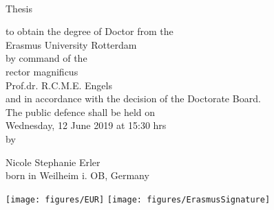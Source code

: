 \setlength{\unitlength}{1mm}
\begin{center}
     \vspace*{0.2cm}
   {
   \fontsize{16}{22}\selectfont{
   \thetitle}  \\[1.05ex]
   }


      \vspace{1cm}

     {\fontsize{14}{18}\selectfont{
     \dutchtitle \\[1.05ex]
     }}
     \vspace{0.5cm}
      {\fontsize{14}{22}\selectfont\par\vspace{0.5cm}
       {Thesis}}
     \vspace{0.5cm}
      {\fontsize{10}{10}\selectfont\par\vspace*{0.5cm}
       {to obtain the degree of Doctor from the\\
       Erasmus University Rotterdam\\
       by command of the\\
       rector magnificus\\ \vspace{0.5cm}
       Prof.dr. R.C.M.E. Engels\\ \vspace{0.5cm}
       and in accordance with the decision of the Doctorate Board.\\ \vspace{1.5cm}
       The public defence shall be held on\\ \vspace{0.5cm}
       Wednesday, 12 June 2019 at 15:30 hrs\\ \vspace{0.5cm}
       by \\ \vspace{0.5cm}}}
      {\fontsize{14}{22}\selectfont Nicole Stephanie Erler}\\\vspace{0.5cm}
      {{\fontsize{10}{10}\selectfont born in Weilheim i. OB, Germany}}\\ \vspace{1cm}
 \end{center}


\vfill

\texttt{[image: figures/EUR]}
\hfill
\texttt{[image: figures/ErasmusSignature]}
\vspace*{-1cm}

